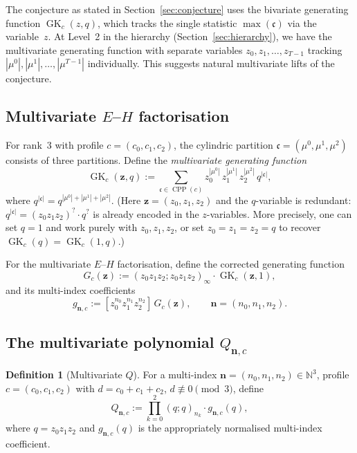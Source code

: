 \documentclass[11pt]{article}
\theoremstyle{plain}
\theoremstyle{definition}
\newtheorem{definition}[theorem]{Definition}
\newcommand{\N}{\mathbb{N}}
\newcommand{\GK}{\operatorname{GK}}
\newcommand{\CPP}{\operatorname{CPP}}
\newcommand{\qpoch}[2]{(#1;#2)_\infty}
\newcommand{\qpochn}[3]{(#1;#2)_{#3}}
\begin{document}
The conjecture as stated in Section~\ref{sec:conjecture} uses the
bivariate generating function $\GK_c(z,q)$, which tracks the single
statistic $\max(\mathfrak{c})$ via the variable~$z$.  At Level~2 in the
hierarchy (Section~\ref{sec:hierarchy}), we have the multivariate
generating function with separate variables $z_0, z_1, \ldots, z_{T-1}$
tracking $|\mu^0|, |\mu^1|, \ldots, |\mu^{T-1}|$ individually.
This suggests natural multivariate lifts of the conjecture.

\subsection{Multivariate $E$--$H$ factorisation}

For rank~3 with profile $c = (c_0, c_1, c_2)$, the cylindric partition
$\mathfrak{c} = (\mu^0, \mu^1, \mu^2)$ consists of three partitions.
Define the \emph{multivariate generating function}
\[
  \GK_c(\mathbf{z}, q)
  := \sum_{\mathfrak{c} \in \CPP(c)}
  z_0^{|\mu^0|}\, z_1^{|\mu^1|}\, z_2^{|\mu^2|}\, q^{|\mathfrak{c}|},
\]
where $q^{|\mathfrak{c}|} = q^{|\mu^0| + |\mu^1| + |\mu^2|}$.
(Here $\mathbf{z} = (z_0, z_1, z_2)$ and the $q$-variable is
redundant: $q^{|\mathfrak{c}|} = (z_0 z_1 z_2)^? \cdot q^?$ is
already encoded in the $z$-variables.
More precisely, one can set $q = 1$ and work purely with $z_0, z_1, z_2$,
or set $z_0 = z_1 = z_2 = q$ to recover $\GK_c(q) = \GK_c(1,q)$.)

For the multivariate $E$--$H$ factorisation, define the corrected
generating function
\begin{equation}
  G_c(\mathbf{z})
  := \qpoch{z_0 z_1 z_2}{z_0 z_1 z_2}
  \cdot \GK_c(\mathbf{z}, 1),
  \label{eq:Gc-multi}
\end{equation}
and its multi-index coefficients
\begin{equation}
  g_{\mathbf{n},c}
  := [z_0^{n_0} z_1^{n_1} z_2^{n_2}]\, G_c(\mathbf{z}),
  \qquad
  \mathbf{n} = (n_0, n_1, n_2).
  \label{eq:gn-multi}
\end{equation}

\subsection{The multivariate polynomial $Q_{\mathbf{n},c}$}

\begin{definition}[Multivariate $Q$]
\label{def:Q-multi}
For a multi-index $\mathbf{n} = (n_0, n_1, n_2) \in \N^3$, profile
$c = (c_0, c_1, c_2)$ with $d = c_0 + c_1 + c_2$,
$d \not\equiv 0 \pmod{3}$, define
\begin{equation}
  Q_{\mathbf{n},c}
  := \prod_{k=0}^{2} \qpochn{q}{q}{n_k}
  \cdot g_{\mathbf{n},c}(q),
  \label{eq:Q-multi}
\end{equation}
where $q = z_0 z_1 z_2$ and $g_{\mathbf{n},c}(q)$ is the
appropriately normalised multi-index coefficient.
\end{definition}
\end{document}
